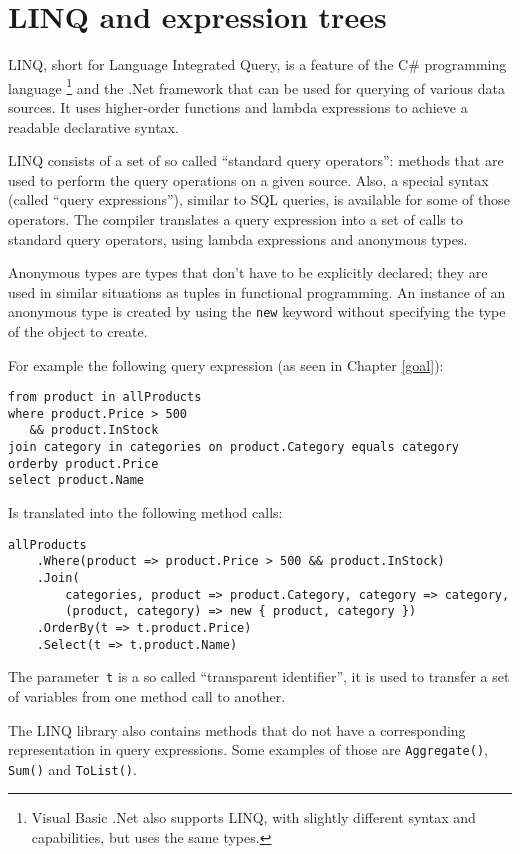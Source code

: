 \chapter{LINQ and expression trees}

LINQ, short for Language Integrated Query, is a feature of the C\# programming language%
\footnote{Visual Basic .Net also supports LINQ, with slightly different syntax
and capabilities, but uses the same types.}
and the .Net framework that can be used for querying of various data sources.
It uses higher-order functions and lambda expressions to achieve a readable declarative syntax.

LINQ consists of a set of so called “standard query operators”:
methods that are used to perform the query operations on a given source.
Also, a special syntax (called “query expressions”), similar to SQL queries, is available
for some of those operators.
The compiler translates a query expression into a set of calls to standard query operators,
using lambda expressions and anonymous types.

Anonymous types are types that don't have to be explicitly declared;
they are used in similar situations as tuples in functional programming.
An instance of an anonymous type is created by using the \lstinline{new} keyword
without specifying the type of the object to create.

For example the following query expression (as seen in Chapter \ref{goal}):

\begin{lstlisting}
from product in allProducts
where product.Price > 500
   && product.InStock
join category in categories on product.Category equals category
orderby product.Price
select product.Name
\end{lstlisting}

Is translated into the following method calls:

\begin{lstlisting}
allProducts
    .Where(product => product.Price > 500 && product.InStock)
    .Join(
        categories, product => product.Category, category => category,
        (product, category) => new { product, category })
    .OrderBy(t => t.product.Price)
    .Select(t => t.product.Name)
\end{lstlisting}

The parameter~\lstinline,t, is a so called “transparent identifier”, it is used to transfer a set of variables from one method call to another.

The LINQ library also contains methods that do not have a corresponding representation in query expressions. Some examples of those are \lstinline,Aggregate(),, \lstinline,Sum(), and \lstinline,ToList(),.

